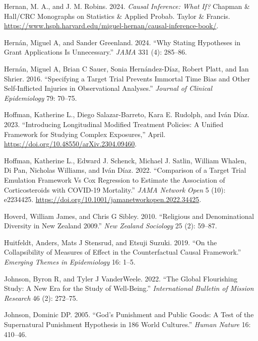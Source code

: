 \documentclass[
  single column]{article}
\newlength{\cslhangindent}
\newenvironment{CSLReferences}[2] %
 {\begin{list}{}{%
  \setlength{\itemindent}{0pt}
  \setlength{\leftmargin}{0pt}
  \setlength{\parsep}{0pt}
  \ifodd #1
   \setlength{\leftmargin}{\cslhangindent}
   \setlength{\itemindent}{-1\cslhangindent}
  \fi
  \setlength{\itemsep}{#2\baselineskip}}}
 {\end{list}}
\begin{document}
\begin{CSLReferences}{1}{0}
Hernan, M. A., and J. M. Robins. 2024. \emph{Causal Inference: What If?}
Chapman \& Hall/CRC Monographs on Statistics \& Applied Probab. Taylor
\& Francis.
\url{https://www.hsph.harvard.edu/miguel-hernan/causal-inference-book/}.

Hernán, Miguel A, and Sander Greenland. 2024. {``Why Stating Hypotheses
in Grant Applications Is Unnecessary.''} \emph{JAMA} 331 (4): 285--86.

Hernán, Miguel A, Brian C Sauer, Sonia Hernández-Díaz, Robert Platt, and
Ian Shrier. 2016. {``Specifying a Target Trial Prevents Immortal Time
Bias and Other Self-Inflicted Injuries in Observational Analyses.''}
\emph{Journal of Clinical Epidemiology} 79: 70--75.

Hoffman, Katherine L., Diego Salazar-Barreto, Kara E. Rudolph, and Iván
Díaz. 2023. {``Introducing Longitudinal Modified Treatment Policies: A
Unified Framework for Studying Complex Exposures,''} April.
\url{https://doi.org/10.48550/arXiv.2304.09460}.

Hoffman, Katherine L., Edward J. Schenck, Michael J. Satlin, William
Whalen, Di Pan, Nicholas Williams, and Iván Díaz. 2022. {``Comparison of
a Target Trial Emulation Framework Vs Cox Regression to Estimate the
Association of Corticosteroids with COVID-19 Mortality.''} \emph{JAMA
Network Open} 5 (10): e2234425.
\url{https://doi.org/10.1001/jamanetworkopen.2022.34425}.

Hoverd, William James, and Chris G Sibley. 2010. {``Religious and
Denominational Diversity in New Zealand 2009.''} \emph{New Zealand
Sociology} 25 (2): 59--87.

Huitfeldt, Anders, Mats J Stensrud, and Etsuji Suzuki. 2019. {``On the
Collapsibility of Measures of Effect in the Counterfactual Causal
Framework.''} \emph{Emerging Themes in Epidemiology} 16: 1--5.

Johnson, Byron R, and Tyler J VanderWeele. 2022. {``The Global
Flourishing Study: A New Era for the Study of Well-Being.''}
\emph{International Bulletin of Mission Research} 46 (2): 272--75.

Johnson, Dominic DP. 2005. {``God{'}s Punishment and Public Goods: A
Test of the Supernatural Punishment Hypothesis in 186 World Cultures.''}
\emph{Human Nature} 16: 410--46.


\end{CSLReferences}
\end{document}
